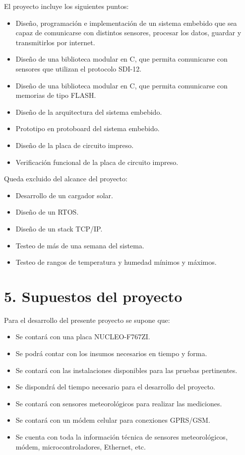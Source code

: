 \documentclass[
11pt, %
]{charter}
\begin{document}
El proyecto incluye los siguientes puntos:
\begin{itemize}
\item Diseño, programación e implementación de un sistema embebido que sea capaz de comunicarse con distintos sensores, procesar los datos, guardar y transmitirlos por internet.
\item Diseño de una biblioteca modular en C, que permita comunicarse con sensores que utilizan el protocolo SDI-12.
\item Diseño de una biblioteca modular en C, que permita comunicarse con memorias de tipo FLASH.
\item Diseño de la arquitectura del sistema embebido.
\item Prototipo en protoboard del sistema embebido.
\item Diseño de la placa de circuito impreso.
\item Verificación funcional de la placa de circuito impreso.
\end{itemize}

Queda excluido del alcance del proyecto:
\begin{itemize}
\item Desarrollo de un cargador solar.
\item Diseño de un RTOS.
\item Diseño de un stack TCP/IP.
\item Testeo de más de una semana del sistema.
\item Testeo de rangos de temperatura y humedad mínimos y máximos.
\end{itemize}


\section{5. Supuestos del proyecto}
\label{sec:supuestos}


Para el desarrollo del presente proyecto se supone que: 

\begin{itemize}
	\item Se contará con una placa NUCLEO-F767ZI.
	\item Se podrá contar con los insumos necesarios en tiempo y forma.
	\item Se contará con las instalaciones disponibles para las pruebas pertinentes.
	\item Se dispondrá del tiempo necesario para el desarrollo del proyecto.
	\item Se contará con sensores meteorológicos para realizar las mediciones.
	\item Se contará con un módem celular para conexiones GPRS/GSM.
	\item Se cuenta con toda la información técnica de sensores meteorológicos, módem, microcontroladores, Ethernet, etc.
\end{itemize}
\end{document}
